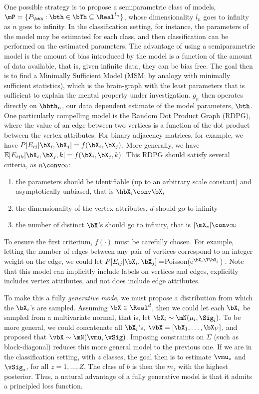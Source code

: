 One possible strategy is to propose a semiparametric class of models, $\mP=\{P_{\bth} : \bth \in \bTh \subseteq \Real^{l_n}\}$, whose dimensionality $l_n$ goes to infinity as $n$ goes to infinity.  In the classification setting, for instance, the parameters of the model may be estimated for each class, and then classification can be performed on the estimated parameters.  The advantage of using a semiparametric model is the amount of bias introduced by the model is a function of the amount of data available, that is, given infinite data, they can be bias free. The goal then is to find a Minimally Sufficient Model (MSM; by analogy with minimally sufficient statistics), which is the brain-graph with the least parameters that is sufficient to explain the mental property under investigation.  $g_n$ then operates directly on $\hbth_n$, our data dependent estimate of the model parameters, $\bth$.  One particularly compelling model is the Random Dot Product Graph (RDPG), where the value of an edge between two vertices is a function of the dot product between the vertex attributes.  For binary adjacency matrices, for example, we have $P[E_{ij} | \bX_i, \bX_j]=f(\bX_i, \bX_j)$.  More generally, we have $\mathbb{E}[E_{ijk} | \bX_i, \bX_j, k]= f(\bX_i, \bX_j, k)$.  This RDPG should satisfy several criteria, as $n \conv \infty$:

\begin{enumerate}
	\item the parameters should be identifiable (up to an arbitrary scale constant) and asymptotically unbiased, that is $\hbX_i \conv \bX_i$
	\item the dimensionality of the vertex attributes, $d$ should go to infinity
	\item the number of distinct $\bX$'s should go to infinity, that is $|\mX_v| \conv \infty$
\end{enumerate}

To ensure the first criterium, $f(\cdot)$ must be carefully chosen.  For example, letting the number of edges between any pair of vertices correspond to an integer weight on the edge, we could let $P[E_{ij} | \bX_i,\bX_j]=$Poisson(e$^{\bX_i\T \bX_j}$) \cite{}.   Note that this model can implicitly include labels on vertices and edges, explicitly includes vertex attributes, and not does include edge attributes.  

To make this a fully \emph{generative mode}, we must propose a distribution from which the $\bX_i$'s are sampled.  Assuming $\bX \in \Real^d$, then we could let each $\bX_i$ be sampled from a multivariate normal, that is, let $\bX_i \sim \mN(\mu_i,\Sig_i)$.  To be more general, we could concatenate all $\bX_i$'s, $\vbX=[\bX_1, \ldots, \bX_V]$, and proposed that $\vbX \sim \mN(\vmu, \vSig)$.  Imposing constraints on $\Sigma$ (such as block-diagonal) reduces this more general model to the previous one.  If we are in the classification setting, with $z$ classes, the goal then is to estimate $\vmu_z$ and $\vSig_z$, for all $z=1,\ldots, Z$.  The class of $b$ is then the $m_z$ with the highest posterior.  Thus, a natural advantage of a fully generative model is that it admits a principled loss function.  


